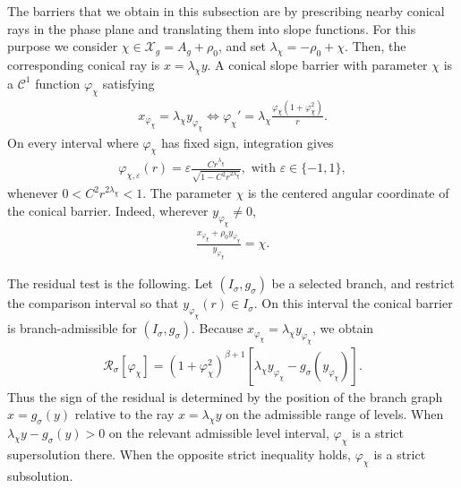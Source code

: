 \documentclass{amsart}
\theoremstyle{plain}
\theoremstyle{mainintrothm}
\theoremstyle{definition}
\begin{document}
	\medskip
	
	The barriers that we obtain in this subsection are by prescribing nearby conical rays in the phase plane and translating them into slope functions. For this purpose we consider $\chi\in\mathcal X_g=A_g+\rho_0$, and set $\lambda_\chi=-\rho_0+\chi$. Then, the corresponding conical ray is $x=\lambda_\chi y$.  A conical slope barrier
	with parameter $\chi$ is a $\mathcal C^1$ function $\varphi_\chi$ satisfying
	\begin{align}
		\label{eq:conical-slope-barrier}
		x_{\varphi_\chi}
		=
		\lambda_\chi y_{\varphi_\chi}
		\Longleftrightarrow
		\varphi_\chi'
		=
		\lambda_\chi
		\frac{\varphi_\chi(1+\varphi_\chi^2)}{r}.
	\end{align}
	On every interval where $\varphi_\chi$ has fixed sign, integration gives
	\begin{align}
		\label{eq:explicit-conical-slope-barrier}
		\varphi_{\chi,\varepsilon}(r)
		=
		\varepsilon
		\frac{C r^{\lambda_\chi}}
		{\sqrt{1-C^2r^{2\lambda_\chi}}},
		\mbox{ with }
		\varepsilon\in\{-1,1\},
	\end{align}
	whenever $0<C^2r^{2\lambda_\chi}<1$.  The parameter $\chi$ is the centered
	angular coordinate of the conical barrier.  Indeed, wherever
	$y_{\varphi_\chi}\ne0$,
	\begin{align*}
		\frac{x_{\varphi_\chi}+\rho_0y_{\varphi_\chi}}
		{y_{\varphi_\chi}}
		=
		\chi.
	\end{align*}
	

	
	The residual test is the following.  Let $(I_\sigma,g_\sigma)$ be a selected
	branch, and restrict the comparison interval so that
	$y_{\varphi_\chi}(r)\in I_\sigma$.  On this interval the conical barrier is
	branch-admissible for $(I_\sigma,g_\sigma)$.  Because
	$x_{\varphi_\chi}=\lambda_\chi y_{\varphi_\chi}$, we obtain
	\begin{align}
		\label{eq:conical-barrier-residual}
		\mathcal R_\sigma[\varphi_\chi]
		=
		(1+\varphi_\chi^2)^{\beta+1}
		\left[
		\lambda_\chi y_{\varphi_\chi}
		-
		g_\sigma(y_{\varphi_\chi})
		\right].
	\end{align}
	Thus the sign of the residual is determined by the position of the branch graph
	$x=g_\sigma(y)$ relative to the ray $x=\lambda_\chi y$ on the admissible range
	of levels.  When $\lambda_\chi y-g_\sigma(y)>0$ on the relevant admissible level interval, $\varphi_\chi$ is a strict supersolution there.  When the opposite strict inequality holds, $\varphi_\chi$ is a strict subsolution.
	
\end{document}

